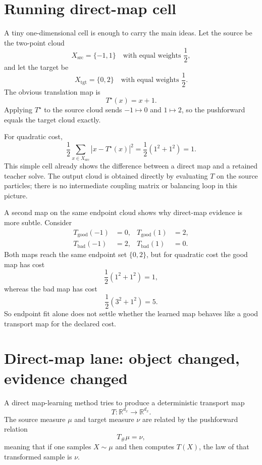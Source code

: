 \section{Running direct-map cell}
\label{sec:bf-neural-ot-direct-running-cell}

A tiny one-dimensional cell is enough to carry the main ideas.  Let the source
be the two-point cloud
\[
  X_{\mathrm{src}}=\{-1,1\}
  \quad\text{with equal weights }\frac{1}{2},
\]
and let the target be
\[
  X_{\mathrm{tgt}}=\{0,2\}
  \quad\text{with equal weights }\frac{1}{2}.
\]
The obvious translation map is
\begin{equation}
\label{eq:bf-neural-ot-direct-shift-map}
  T^\star(x)=x+1.
\end{equation}
Applying \(T^\star\) to the source cloud sends \(-1\mapsto 0\) and
\(1\mapsto 2\), so the pushforward equals the target cloud exactly.

For quadratic cost,
\begin{equation}
\label{eq:bf-neural-ot-direct-shift-cost}
  \frac{1}{2}\sum_{x\in X_{\mathrm{src}}}|x-T^\star(x)|^2
  =
  \frac{1}{2}(1^2+1^2)=1.
\end{equation}
This simple cell already shows the difference between a direct map and a retained
teacher solve.  The output cloud is obtained directly by evaluating \(T\) on the
source particles; there is no intermediate coupling matrix or balancing loop in
this picture.

A second map on the same endpoint cloud shows why direct-map evidence is more
subtle.  Consider
\begin{align}
\label{eq:bf-neural-ot-direct-good-bad-maps}
  T_{\mathrm{good}}(-1)&=0,
  &T_{\mathrm{good}}(1)&=2,\\
  T_{\mathrm{bad}}(-1)&=2,
  &T_{\mathrm{bad}}(1)&=0.
\end{align}
Both maps reach the same endpoint set \(\{0,2\}\), but for quadratic cost the
good map has cost
\[
  \frac{1}{2}(1^2+1^2)=1,
\]
whereas the bad map has cost
\[
  \frac{1}{2}(3^2+1^2)=5.
\]
So endpoint fit alone does not settle whether the learned map behaves like a
good transport map for the declared cost.

\section{Direct-map lane: object changed, evidence changed}
\label{sec:bf-neural-ot-direct-object}

A direct map-learning method tries to produce a deterministic transport map
\begin{equation}
\label{eq:bf-neural-ot-direct-map-object}
  T:
  \mathbb R^{d_x}\to\mathbb R^{d_x}.
\end{equation}
The source measure \(\mu\) and target measure \(\nu\) are related by the
pushforward relation
\begin{equation}
\label{eq:bf-neural-ot-direct-pushforward}
  T_\#\mu = \nu,
\end{equation}
meaning that if one samples \(X\sim\mu\) and then computes \(T(X)\), the law of
that transformed sample is \(\nu\).

